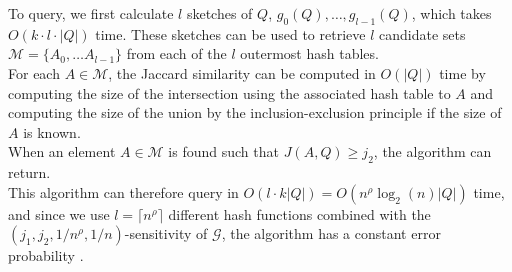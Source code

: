 To query, we first calculate $l$ sketches of $Q$, $g_0(Q), \dots, g_{l-1}(Q)$, which takes $O(k \cdot l \cdot |Q|)$ time. These sketches can be used to retrieve $l$ candidate sets $\mathcal{M} = \{ A_0, \dots A_{l-1}\}$ from each of the $l$ outermost hash tables. \\
For each $A\in \mathcal{M}$, the Jaccard similarity can be computed in $O(|Q|)$ time by computing the size of the intersection using the associated hash table to $A$ and computing the size of the union by the inclusion-exclusion principle if the size of $A$ is known.\\
When an element $A\in \mathcal{M}$ is found such that $J(A,Q) \geq j_2$, the algorithm can return.\\
This algorithm can therefore query in $O(l\cdot k |Q|) = O(n^\rho\log_2{(n)}|Q|)$ time, and since we use $l=\lceil n^\rho \rceil$ different hash functions combined with the $(j_1, j_2, 1/n^\rho, 1/n)$-sensitivity of $\mathcal{G}$, the algorithm has a constant error probability \cite{fast-similarity-search}.
